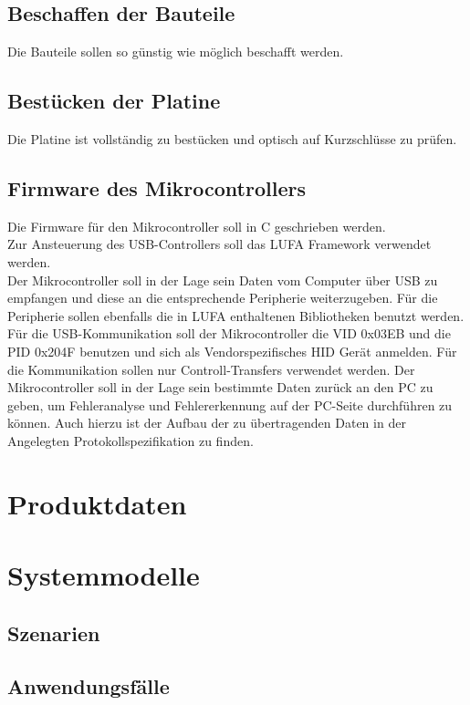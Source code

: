 \documentclass[a4paper,12pt]{article}
\begin{document}
\subsection{Beschaffen der Bauteile}

Die Bauteile sollen so günstig wie möglich beschafft werden. 

\subsection{Bestücken der Platine}

Die Platine ist vollständig zu bestücken und optisch auf Kurzschlüsse zu prüfen.

\subsection{Firmware des Mikrocontrollers}

Die Firmware für den Mikrocontroller soll in C geschrieben werden.\\
Zur Ansteuerung des USB-Controllers soll das LUFA Framework verwendet werden.\\
Der Mikrocontroller soll in der Lage sein Daten vom Computer über USB zu empfangen und diese
an die entsprechende Peripherie weiterzugeben. Für die Peripherie sollen ebenfalls die in LUFA enthaltenen Bibliotheken
benutzt werden.\\
Für die USB-Kommunikation soll der Mikrocontroller die VID 0x03EB und die PID 0x204F benutzen und sich als Vendorspezifisches HID Gerät anmelden. Für die Kommunikation sollen nur Controll-Transfers verwendet werden. Der Mikrocontroller soll in der Lage sein bestimmte Daten zurück an den PC zu geben, um Fehleranalyse und Fehlererkennung auf der PC-Seite durchführen zu können.
Auch hierzu ist der Aufbau der zu übertragenden Daten in der Angelegten Protokollspezifikation zu finden.


\section{Produktdaten}

\section{Systemmodelle}
\subsection{Szenarien}
\subsection{Anwendungsfälle}

\clearpage
 
\end{document}
